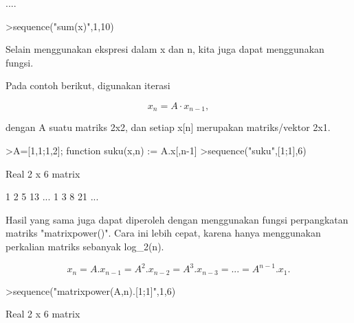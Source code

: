 \documentclass[a4paper,10pt]{article}
\begin{document}
\begin{eulernotebook}
\begin{eulercomment}
\begin{eulercomment}
\begin{eulercomment}
\begin{eulercomment}
\begin{eulercomment}
\begin{eulercomment}
\begin{eulercomment}
\begin{eulercomment}
\begin{eulercomment}
\begin{eulercomment}
\begin{eulercomment}
\begin{eulercomment}
\begin{eulercomment}
\begin{eulercomment}
\begin{eulercomment}
\begin{eulercomment}
\begin{eulercomment}
\begin{eulercomment}
\begin{eulercomment}
\begin{eulercomment}
\begin{eulercomment}
....
\end{eulercomment}
\begin{eulerprompt}
>sequence("sum(x)",1,10)
\end{eulerprompt}
\begin{euleroutput}
  [1,  1,  2,  4,  8,  16,  32,  64,  128,  256]
\end{euleroutput}
\begin{eulercomment}
Selain menggunakan ekspresi dalam x dan n, kita juga dapat menggunakan fungsi.

Pada contoh berikut, digunakan iterasi

\end{eulercomment}
\begin{eulerformula}
\[
x_n =A \cdot x_{n-1},
\]
\end{eulerformula}
\begin{eulercomment}
dengan A suatu matriks 2x2, dan setiap x[n] merupakan matriks/vektor 2x1.
\end{eulercomment}
\begin{eulerprompt}
>A=[1,1;1,2]; function suku(x,n) := A.x[,n-1]
>sequence("suku",[1;1],6)
\end{eulerprompt}
\begin{euleroutput}
  Real 2 x 6 matrix
  
              1             2             5            13     ...
              1             3             8            21     ...
\end{euleroutput}
\begin{eulercomment}
Hasil yang sama juga dapat diperoleh dengan menggunakan fungsi perpangkatan matriks
"matrixpower()". Cara ini lebih cepat, karena hanya menggunakan perkalian matriks sebanyak
log\_2(n).

\end{eulercomment}
\begin{eulerformula}
\[
x_n=A.x_{n-1}=A^2.x_{n-2}=A^3.x_{n-3}= ... = A^{n-1}.x_1.
\]
\end{eulerformula}
\begin{eulerprompt}
>sequence("matrixpower(A,n).[1;1]",1,6)
\end{eulerprompt}
\begin{euleroutput}
  Real 2 x 6 matrix
  

\end{euleroutput}
\end{eulercomment}
\end{eulercomment}
\end{eulercomment}
\end{eulercomment}
\end{eulercomment}
\end{eulercomment}
\end{eulercomment}
\end{eulercomment}
\end{eulercomment}
\end{eulercomment}
\end{eulercomment}
\end{eulercomment}
\end{eulercomment}
\end{eulercomment}
\end{eulercomment}
\end{eulercomment}
\end{eulercomment}
\end{eulercomment}
\end{eulercomment}
\end{eulercomment}
\end{eulernotebook}
\end{document}
